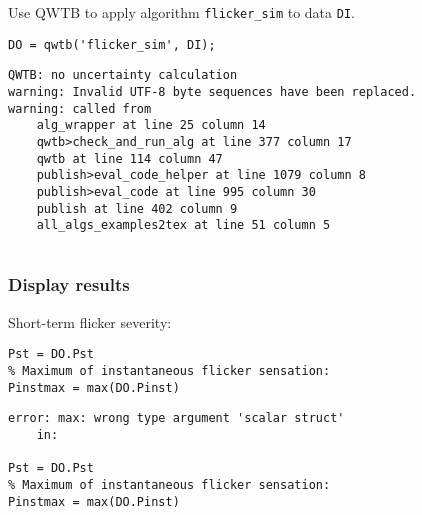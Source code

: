 Use QWTB to apply algorithm \texttt{flicker\_sim} to data \texttt{DI}.

\begin{lstlisting}
DO = qwtb('flicker_sim', DI);
\end{lstlisting}
\begin{lstlisting}[language={},xleftmargin=5pt,frame=none]
QWTB: no uncertainty calculation
warning: Invalid UTF-8 byte sequences have been replaced.
warning: called from
    alg_wrapper at line 25 column 14
    qwtb>check_and_run_alg at line 377 column 17
    qwtb at line 114 column 47
    publish>eval_code_helper at line 1079 column 8
    publish>eval_code at line 995 column 30
    publish at line 402 column 9
    all_algs_examples2tex at line 51 column 5
 

\end{lstlisting}


{}
\subsubsection*{Display results}



Short-term flicker severity:

\begin{lstlisting}
Pst = DO.Pst
% Maximum of instantaneous flicker sensation:
Pinstmax = max(DO.Pinst)
\end{lstlisting}
\begin{lstlisting}[language={},xleftmargin=5pt,frame=none]
error: max: wrong type argument 'scalar struct'
	in:

Pst = DO.Pst
% Maximum of instantaneous flicker sensation:
Pinstmax = max(DO.Pinst)
\end{lstlisting}


\stopcontents[localtoc]
